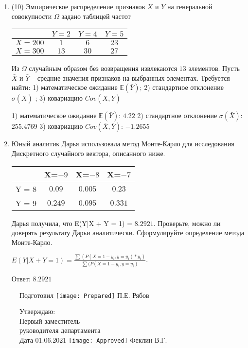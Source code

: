 \documentclass[a4paper,12pt]{article}
\begin{document}
\begin{enumerate}
    

\item


(10) Эмпирическое распределение признаков $X$ и $Y$ на генеральной совокупности $\Omega$ задано таблицей частот  
 
\begin{tabular}{ | c | c | c | c | }
\hline
 & $Y = 2$ & $Y = 4$ & $Y = 5$  \\ \hline
$X = 200$ & $1$ & $6$ & $23$\\ \hline
$X = 300$ & $13$ & $30$ & $27$\\
\hline
\end{tabular}

Из $\Omega$ случайным образом без возвращения извлекаются $13$ элементов. 
Пусть $\bar X$ и $\bar Y$ – средние значения признаков на выбранных элементах. 
Требуется найти: 1) математическое ожидание $\mathbb{E}(\bar Y)$; 2) стандартное отклонение $\sigma(\bar X)$ ; 
3) ковариацию $Cov(\bar X, \bar Y)$




1) математическое ожидание $\mathbb{E}(\bar Y)$: $4.22$ 
2) стандартное отклонение $\sigma(\bar X)$: $255.4769$
3) ковариацию $Cov(\bar X, \bar Y)$: $-1.2655$


\item

    
    	Юный аналитик Дарья использовала метод Монте-Карло для исследования Дискретного случайного вектора, описанного ниже.

        \begin{tabular}{|c|c|c|c|}
	\hline
	& X=$-9$ & X=$-8$ & X=$-7$ \\
	\hline
	Y = $8$ & $0.09$ & $0.005$  &  $0.23$ \\
	\hline
	Y = $9$ & $0.249$ & $0.095$ & $0.331$  \\
	\hline
\end{tabular}

    	Дарья получила, что E(Y|X + Y = 1) = $8.2921$.
    	Проверьте, можно ли доверять результату Дарьи аналитически. Сформулируйте определение метода Монте-Карло.
    


    
        $E(Y|X+Y=1) = \frac{\sum(P(X=1 - y_i, y=y_i) * y_i)}{\sum(P(X=1 - y_i, y=y_i)}$.

        Ответ: $8.2921$
    


\end{enumerate}

\begin{figure}[H]
	Подготовил
	\hfill
	\texttt{[image: Prepared]}
	П.Е. Рябов
\end{figure}


\begin{figure}[H]
	Утверждаю:\\
	Первый заместитель\\
	руководителя департамента\\
	Дата 01.06.2021
	\hfill
	\texttt{[image: Approved]}
	Феклин В.Г.
\end{figure}
\end{document}
